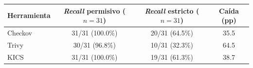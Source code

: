 \begin{tabular}{lccc}
\toprule
Herramienta & \textit{Recall} permisivo ($n=31$) & \textit{Recall} estricto ($n=31$) & Caída (pp) \\
\midrule
Checkov & 31/31 (100.0\%) & 20/31 (64.5\%) & 35.5 \\
Trivy & 30/31 (96.8\%) & 10/31 (32.3\%) & 64.5 \\
KICS & 31/31 (100.0\%) & 19/31 (61.3\%) & 38.7 \\
\bottomrule
\end{tabular}
